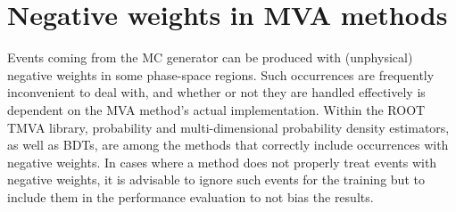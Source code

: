 \section{Negative weights in MVA methods}
Events coming from the MC generator can be produced with (unphysical) negative weights in some phase-space 
regions. Such occurrences are frequently inconvenient to deal with, and whether or not they are handled effectively 
is dependent on the MVA method's actual implementation. 
Within the ROOT TMVA library, probability and multi-dimensional probability density 
estimators, as well as BDTs, are among the methods that correctly include occurrences with negative weights.
In cases where a method does not properly treat events with negative weights, it is advisable to ignore such events 
for the training but to include them in the performance evaluation to not bias the results.

\begin{comment}
asdf
%
\end{comment}
